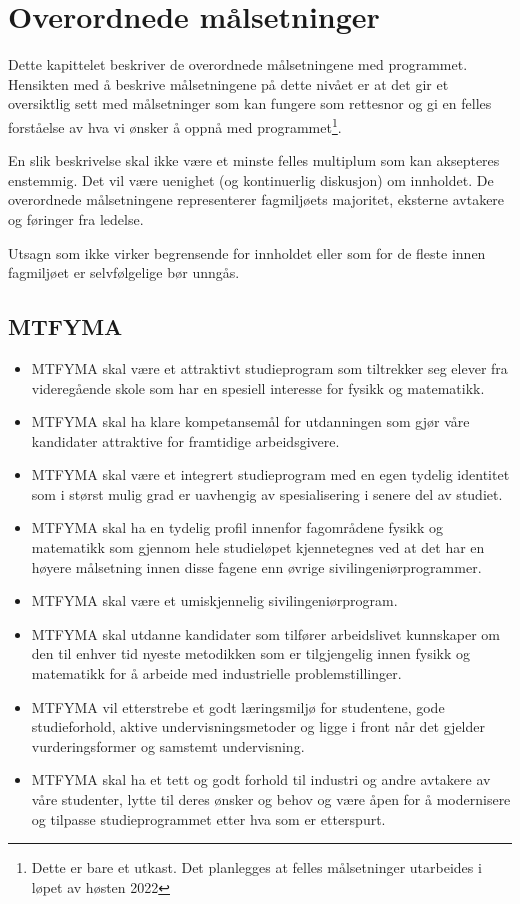 \chapter{Overordnede målsetninger}

Dette kapittelet beskriver de overordnede målsetningene med programmet. Hensikten med å beskrive målsetningene på dette nivået er at det gir et oversiktlig sett med målsetninger som kan fungere som rettesnor og gi en felles forståelse av hva vi ønsker å oppnå med programmet\footnote{Dette er bare et utkast. Det planlegges at felles målsetninger utarbeides i løpet av høsten 2022}.

En slik beskrivelse skal ikke være et minste felles multiplum som kan aksepteres enstemmig. Det vil være uenighet (og kontinuerlig diskusjon) om innholdet. De overordnede målsetningene representerer fagmiljøets majoritet, eksterne avtakere og føringer fra ledelse. 

Utsagn som ikke virker begrensende for innholdet eller som for de fleste innen fagmiljøet er selvfølgelige bør unngås.

\section{MTFYMA}

\begin{itemize}
	\item MTFYMA skal være et attraktivt studieprogram som tiltrekker seg elever fra videregående skole som har en spesiell interesse for fysikk og matematikk.
	\item MTFYMA skal ha klare kompetansemål for utdanningen som gjør våre kandidater attraktive for framtidige arbeidsgivere.
	\item MTFYMA skal være et integrert studieprogram med en egen tydelig identitet som i størst mulig grad er uavhengig av spesialisering i senere del av studiet.
	\item MTFYMA skal ha en tydelig profil innenfor fagområdene fysikk og matematikk som gjennom hele studieløpet kjennetegnes ved at det har en høyere målsetning innen disse fagene enn øvrige sivilingeniørprogrammer.
	\item MTFYMA skal være et umiskjennelig sivilingeniørprogram.
	\item MTFYMA skal utdanne kandidater som tilfører arbeidslivet kunnskaper om den til enhver tid nyeste metodikken som er tilgjengelig innen fysikk og matematikk for å arbeide med industrielle problemstillinger.
	\item MTFYMA vil etterstrebe et godt læringsmiljø for studentene, gode studieforhold, aktive undervisningsmetoder og ligge i front når det gjelder vurderingsformer og samstemt undervisning.
	\item MTFYMA skal ha et tett og godt forhold til industri og andre avtakere av våre studenter, lytte til deres ønsker og behov og være åpen for å modernisere og tilpasse studieprogrammet etter hva som er etterspurt.
\end{itemize}

